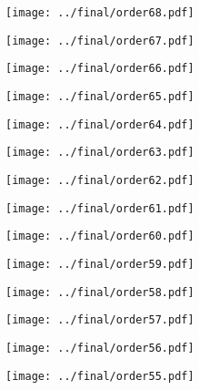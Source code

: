 \documentclass{article}
\begin{document}
\begin{figure}[H]
    \centering
    \texttt{[image: ../final/order68.pdf]}
\end{figure}
\begin{figure}[H]
    \centering
    \texttt{[image: ../final/order67.pdf]}
\end{figure}
\begin{figure}[H]
    \centering
    \texttt{[image: ../final/order66.pdf]}
\end{figure}
\begin{figure}[H]
    \centering
    \texttt{[image: ../final/order65.pdf]}
\end{figure}
\begin{figure}[H]
    \centering
    \texttt{[image: ../final/order64.pdf]}
\end{figure}
\begin{figure}[H]
    \centering
    \texttt{[image: ../final/order63.pdf]}
\end{figure}
\begin{figure}[H]
    \centering
    \texttt{[image: ../final/order62.pdf]}
\end{figure}
\begin{figure}[H]
    \centering
    \texttt{[image: ../final/order61.pdf]}
\end{figure}
\begin{figure}[H]
    \centering
    \texttt{[image: ../final/order60.pdf]}
\end{figure}
\begin{figure}[H]
    \centering
    \texttt{[image: ../final/order59.pdf]}
\end{figure}
\begin{figure}[H]
    \centering
    \texttt{[image: ../final/order58.pdf]}
\end{figure}
\begin{figure}[H]
    \centering
    \texttt{[image: ../final/order57.pdf]}
\end{figure}
\begin{figure}[H]
    \centering
    \texttt{[image: ../final/order56.pdf]}
\end{figure}
\begin{figure}[H]
    \centering
    \texttt{[image: ../final/order55.pdf]}
\end{figure}
\end{document}
